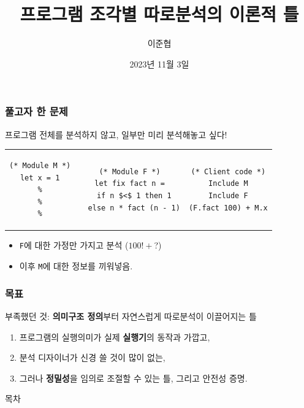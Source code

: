 \documentclass{beamer}
\title{프로그램 조각별 따로분석의 이론적 틀}
\author{이준협}
\date{2023년 11월 3일}
\institute{ROPAS{@}SNU}
\theoremstyle{definition}
\begin{document}
\maketitle
\begin{frame}[c,fragile]
  \frametitle{풀고자 한 문제}
  프로그램 전체를 분석하지 않고, 일부만 미리 분석해놓고 싶다!

  \begin{tabular}{ccc}
    \begin{minipage}{0.3\linewidth}
      \begin{lstlisting}[language=Coq]
(* Module M *)
let x = 1
%
%
%
      \end{lstlisting}
    \end{minipage} &
    \begin{minipage}{0.3\linewidth}
      \begin{lstlisting}[language=Coq]
(* Module F *)
let fix fact n =
  if n $<$ 1 then 1
  else n * fact (n - 1)
      \end{lstlisting}
    \end{minipage}  &
    \begin{minipage}{0.3\linewidth}
      \begin{lstlisting}[language=Coq]
(* Client code *)
Include M
Include F
(F.fact 100) + M.x
      \end{lstlisting}
    \end{minipage}
  \end{tabular}

  \begin{itemize}
    \item \texttt{F}에 대한 가정만 가지고 분석 ($100!+$?)
    \item 이후 \texttt{M}에 대한 정보를 끼워넣음.
  \end{itemize}

  \pause
  \begin{center}

  \end{center}
\end{frame}
\begin{frame}[c]
  \frametitle{목표}
  부족했던 것: \textbf{의미구조 정의}부터 자연스럽게 따로분석이 이끌어지는 틀
  \begin{enumerate}
    \item 프로그램의 실행의미가 실제 \textbf{실행기}의 동작과 가깝고,
    \item 분석 디자이너가 신경 쓸 것이 많이 없는,
    \item 그러나 \textbf{정밀성}을 임의로 조절할 수 있는 틀, 그리고 안전성 증명.
  \end{enumerate}
\end{frame}
\begin{frame}{목차}
  \tableofcontents
\end{frame}
\end{document}
